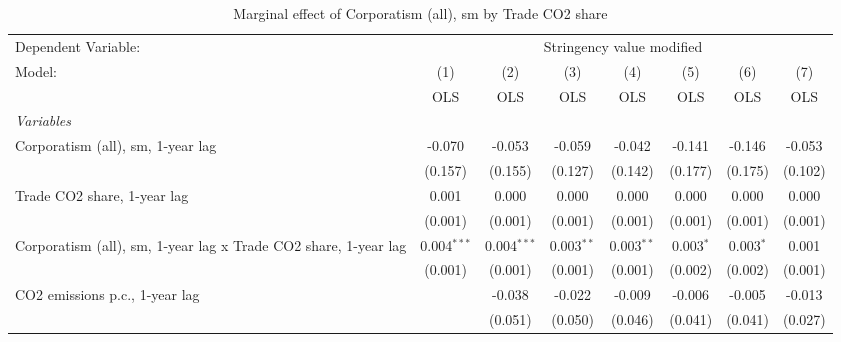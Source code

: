 
\begin{table}[htbp]
   \caption{Marginal effect of Corporatism (all), sm by Trade CO2 share}
   \centering
   \begin{tabular}{lccccccc}
      \toprule
      Dependent Variable: & \multicolumn{7}{c}{Stringency value modified}\\
      Model:                                                          & (1)           & (2)           & (3)          & (4)          & (5)           & (6)           & (7)\\  
                                                                      &  OLS          & OLS           & OLS          & OLS          & OLS           & OLS           & OLS\\  
      \midrule
      \emph{Variables}\\
      Corporatism (all), sm, 1-year lag                               & -0.070        & -0.053        & -0.059       & -0.042       & -0.141        & -0.146        & -0.053\\   
                                                                      & (0.157)       & (0.155)       & (0.127)      & (0.142)      & (0.177)       & (0.175)       & (0.102)\\   
      Trade CO2 share, 1-year lag                                     & 0.001         & 0.000         & 0.000        & 0.000        & 0.000         & 0.000         & 0.000\\   
                                                                      & (0.001)       & (0.001)       & (0.001)      & (0.001)      & (0.001)       & (0.001)       & (0.001)\\   
      Corporatism (all), sm, 1-year lag x Trade CO2 share, 1-year lag & 0.004$^{***}$ & 0.004$^{***}$ & 0.003$^{**}$ & 0.003$^{**}$ & 0.003$^{*}$   & 0.003$^{*}$   & 0.001\\   
                                                                      & (0.001)       & (0.001)       & (0.001)      & (0.001)      & (0.002)       & (0.002)       & (0.001)\\   
      CO2 emissions p.c., 1-year lag                                  &               & -0.038        & -0.022       & -0.009       & -0.006        & -0.005        & -0.013\\   
                                                                      &               & (0.051)       & (0.050)      & (0.046)      & (0.041)       & (0.041)       & (0.027)\\   

\end{tabular}
\end{table}
